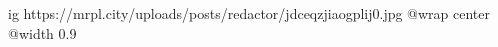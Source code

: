  
 
 
 
 

\ifcmt
  ig https://mrpl.city/uploads/posts/redactor/jdceqzjiaogplij0.jpg
  @wrap center
  @width 0.9
\fi

